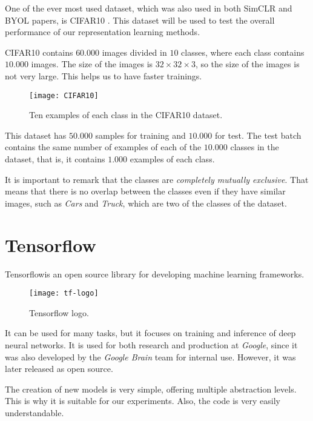 One of the ever most used dataset, which was also used in both SimCLR and BYOL papers, is CIFAR10 \citep{krizhevsky_learning_nodate}. This dataset will be used to test the overall performance of our representation learning methods.

CIFAR10 contains $60.000$ images divided in $10$ classes, where each class contains $10.000$ images. The size of the images is $32\times 32\times 3$, so the size of the images is not very large. This helps us to have faster trainings.

\begin{figure}[H]
    \centering 
    \texttt{[image: CIFAR10]}
    \caption{Ten examples of each class in the CIFAR10 dataset. }
\end{figure}
This dataset has $50.000$ samples for training and $10.000$ for test. The test batch contains the same number of examples of each of the $10.000$ classes in the dataset, that is, it contains $1.000$ examples of each class. 

It is important to remark that the classes are \emph{completely mutually exclusive}. That means that there is no overlap between the classes even if they have similar images, such as \emph{Cars} and \emph{Truck}, which are two of the classes of the dataset.

\section{Tensorflow}



Tensorflow\footnotemark is an open source library for developing machine learning frameworks.  

\begin{wrapfigure}{r}{5cm}
    \caption{Tensorflow logo.}
    \texttt{[image: tf-logo]}
\end{wrapfigure}




It can be used for many tasks, but it focuses on training and inference of deep neural networks. It is used for both research and production at \emph{Google}, since it was also developed by the \emph{Google Brain} team for internal use. However, it was later released as open source.

The creation of new models is very simple, offering multiple abstraction levels. This is why it is suitable for our experiments. Also, the code is very easily understandable.

